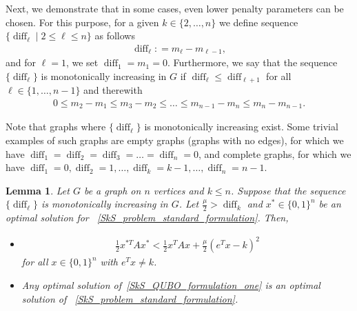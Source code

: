 \documentclass{article}
\DeclareMathOperator{\diff}{diff}
\newtheorem{lem}[thm]{Lemma}
\begin{document}
Next, we demonstrate that in some cases, even lower penalty parameters can be chosen. For this purpose, for a given $k \in \{2, \ldots, n\}$ we define sequence $\{\diff_\ell\mid 2\le \ell \le n\}$ as follows 
\begin{align*}
\diff_\ell : = m_\ell - m_{\ell-1},
\end{align*}
and for $\ell=1$, we set $\diff_1 = m_1=0$. Furthermore, we say that the sequence $\{\diff_\ell\}$ is monotonically increasing in $G$ 
if $\diff_{\ell} \leq \diff_{\ell+1}$ for all $\ell \in \{1, \ldots, n-1\}$ and therewith
\begin{align*}
0 \leq m_2 - m_{1} \leq m_3 - m_{2} \leq \ldots \leq m_{n-1} - m_{n} \leq m_n - m_{n-1}.
\end{align*}

Note that graphs where $\{\diff_\ell\}$ is monotonically increasing exist. Some trivial examples of such graphs are empty graphs (graphs with no edges), for which we have 
$\diff_1 = \diff_2 = \diff_3 = \ldots =  \diff_n = 0$, and complete graphs, for which we have 
$\diff_1 = 0,  \diff_2 = 1,  \ldots, \diff_k=k-1,\ldots,   \diff_n = n-1.$
\\

\begin{lem}\label{quadratic_SkS_lower_penalty}
Let $G$ be a graph on $n$ vertices and $k \leq n$. Suppose that the sequence $\{\diff_{\ell}\}$ is monotonically increasing in $G$. Let 
 $\frac{\mu}{2} > \diff_k$ and $x^* \in \{0, 1\}^n$ be an optimal solution for ~\eqref{SkS_problem_standard_formulation}. Then,
\begin{itemize}
\item [(i)]
    \begin{align}\label{SkS_quadratic_3}
\frac{1}{2} x^{*T} A x^* < \frac{1}{2} x^T A x + \frac{\mu}{2}(e^Tx - k)^2
\end{align}
for all $x \in \{0, 1\}^n$ with $e^Tx \neq k$. 

   \item [(ii)]Any  optimal solution of~\eqref{SkS_QUBO_formulation_one}  is an optimal solution of ~\eqref{SkS_problem_standard_formulation}.
\end{itemize}
\end{lem} 
\end{document}
